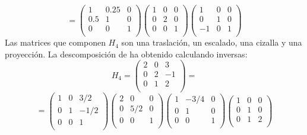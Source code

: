 \[=	\left( \begin{array}{lrc}
1 & 0.25 & 0 \\
0.5 & 1 & 0 \\
0 & 0 & 1 \\ \end{array} \right)
\left( \begin{array}{lrc}
1 & 0 & 0 \\
0 & 2 & 0 \\
0 & 0 & 1 \\ \end{array} \right)
\left( \begin{array}{lrc}
1 & 0 & 0 \\
0 & 1 & 0 \\
-1 & 0 & 1 \\ \end{array} \right)\]
Las matrices que componen $H_4$ son una traslación, un escalado, una cizalla y una proyección. La descomposición de ha obtenido calculando inversas:
\[ H_4 = \left( \begin{array}{lrc}
2 & 0 & 3 \\
0 & 2 & -1 \\
0 & 1 & 2 \\ \end{array} \right) =\]
\[=	\left( \begin{array}{lrc}
1 & 0 & 3/2 \\
0 & 1 & -1/2 \\
0 & 0 & 1 \\ \end{array} \right)
\left( \begin{array}{lrc}
2 & 0 & 0 \\
0 & 5/2 & 0 \\
0 & 0 & 1 \\ \end{array} \right)
\left( \begin{array}{lrc}
1 & -3/4 & 0 \\
0 & 1 & 0 \\
0 & 0 & 1 \\ \end{array} \right)
\left( \begin{array}{lrc}
1 & 0 & 0 \\
0 & 1 & 0 \\
0 & 1 & 2 \\ \end{array} \right)\] 


